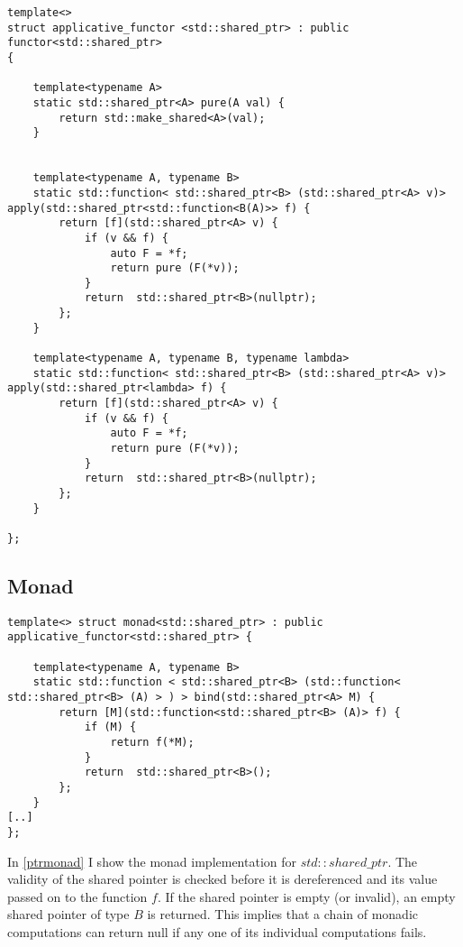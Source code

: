 \documentclass[12pt,fleqn]{article}
\begin{document}
\begin{minipage}{\linewidth}
\begin{lstlisting}[caption=applicative functor implemention for std::shared\_ptr, label=ptrapp]
template<>
struct applicative_functor <std::shared_ptr> : public functor<std::shared_ptr>
{

	template<typename A>
	static std::shared_ptr<A> pure(A val) {
		return std::make_shared<A>(val);
	}

	
	template<typename A, typename B>
	static std::function< std::shared_ptr<B> (std::shared_ptr<A> v)> apply(std::shared_ptr<std::function<B(A)>> f) {
		return [f](std::shared_ptr<A> v) {
			if (v && f) {
				auto F = *f;
				return pure (F(*v)); 
			}
			return  std::shared_ptr<B>(nullptr);
		};
    }

	template<typename A, typename B, typename lambda>
	static std::function< std::shared_ptr<B> (std::shared_ptr<A> v)> apply(std::shared_ptr<lambda> f) {
		return [f](std::shared_ptr<A> v) {
			if (v && f) {
				auto F = *f;
				return pure (F(*v)); 
			}
			return  std::shared_ptr<B>(nullptr);
		};
    }
    
};
\end{lstlisting}
\end{minipage}

   
%
\subsection{Monad}

%
%
%
\begin{minipage}{\linewidth}
\begin{lstlisting}[caption=monad implemention for std::shared\_ptr, label=ptrmonad]
template<> struct monad<std::shared_ptr> : public applicative_functor<std::shared_ptr> {

	template<typename A, typename B>
	static std::function < std::shared_ptr<B> (std::function< std::shared_ptr<B> (A) > ) > bind(std::shared_ptr<A> M) {
		return [M](std::function<std::shared_ptr<B> (A)> f) {
			if (M) {
				return f(*M);
			}
			return  std::shared_ptr<B>();
		};
	}
[..]
};
\end{lstlisting}
\end{minipage}
%
%
%

In \ref{ptrmonad} I show the monad implementation for $std::shared\_ptr$. 
The validity of the shared pointer is checked before it is dereferenced and its value passed on to the function $f$.
If the shared pointer is empty (or invalid), an empty shared pointer of type $B$ is returned.
This implies that a chain of monadic computations can return null if any one of its individual computations fails.
\end{document}

